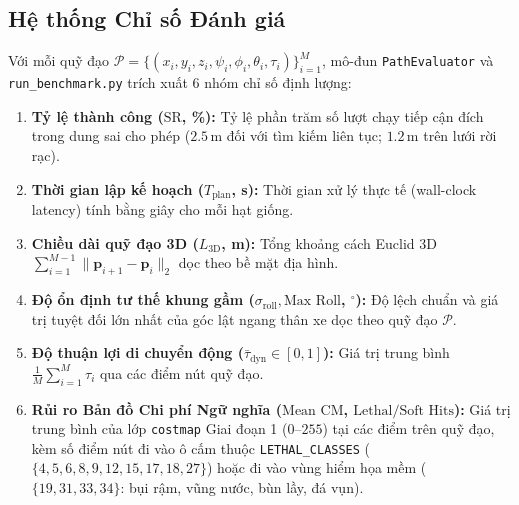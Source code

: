 \documentclass[a4paper,fleqn]{cas-sc}
\begin{document}
\subsection{Hệ thống Chỉ số Đánh giá}
Với mỗi quỹ đạo $\mathcal{P} = \{(x_i, y_i, z_i, \psi_i, \phi_i, \theta_i, \tau_i)\}_{i=1}^M$, mô-đun \texttt{PathEvaluator} và \texttt{run\_benchmark.py} trích xuất 6 nhóm chỉ số định lượng:
\begin{enumerate}
    \item \textbf{Tỷ lệ thành công ($\text{SR}$, \%):} Tỷ lệ phần trăm số lượt chạy tiếp cận đích trong dung sai cho phép ($2.5\,\text{m}$ đối với tìm kiếm liên tục; $1.2\,\text{m}$ trên lưới rời rạc).
    \item \textbf{Thời gian lập kế hoạch ($T_{\text{plan}}$, s):} Thời gian xử lý thực tế (wall-clock latency) tính bằng giây cho mỗi hạt giống.
    \item \textbf{Chiều dài quỹ đạo 3D ($L_{\text{3D}}$, m):} Tổng khoảng cách Euclid 3D $\sum_{i=1}^{M-1} \|\mathbf{p}_{i+1} - \mathbf{p}_i\|_2$ dọc theo bề mặt địa hình.
    \item \textbf{Độ ổn định tư thế khung gầm ($\sigma_{\text{roll}}, \text{Max Roll}$, $^\circ$):} Độ lệch chuẩn và giá trị tuyệt đối lớn nhất của góc lật ngang thân xe dọc theo quỹ đạo $\mathcal{P}$.
    \item \textbf{Độ thuận lợi di chuyển động ($\bar{\tau}_{\text{dyn}} \in [0, 1]$):} Giá trị trung bình $\frac{1}{M}\sum_{i=1}^M \tau_i$ qua các điểm nút quỹ đạo.
    \item \textbf{Rủi ro Bản đồ Chi phí Ngữ nghĩa ($\text{Mean CM}$, $\text{Lethal/Soft Hits}$):} Giá trị trung bình của lớp \texttt{costmap} Giai đoạn 1 ($0\text{--}255$) tại các điểm trên quỹ đạo, kèm số điểm nút đi vào ô cấm thuộc \texttt{LETHAL\_CLASSES} ($\{4,5,6,8,9,12,15,17,18,27\}$) hoặc đi vào vùng hiểm họa mềm ($\{19, 31, 33, 34\}$: bụi rậm, vũng nước, bùn lầy, đá vụn).
\end{enumerate}
\end{document}
